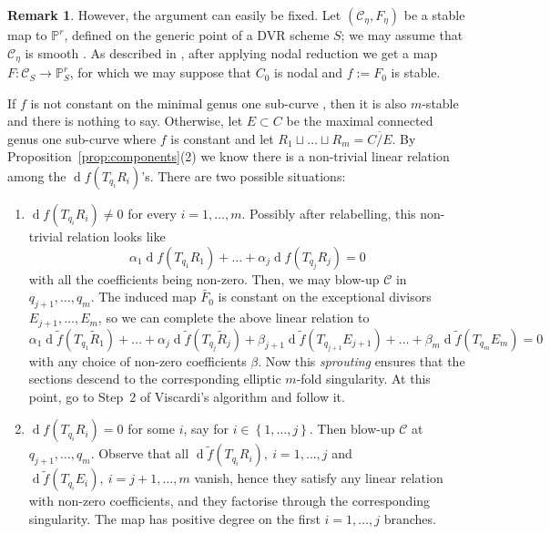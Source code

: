 \documentclass[11pt]{amsart}
\newcommand{\PP}{\mathbb P}
\renewcommand{\to}{\rightarrow}
\theoremstyle{plain}
\theoremstyle{definition}
\newtheorem{remark}[thm]{Remark}
\begin{document}
\begin{remark}
However, the argument can easily be fixed. Let $(\mathcal{C}_\eta,F_{\eta})$ be a stable map to $\PP^r$, defined on the generic point of a DVR scheme $S$; we may assume that $\mathcal C_{\eta}$ is smooth \cite[Section~3.2.1]{VISC}. 
As described in \cite[Step~1, Theorem~3.6]{VISC}, after applying nodal reduction we get a map $F\colon\mathcal C_S\to\PP^r_{S}$, for which we may suppose that $C_0$ is nodal and $f:=F_0$ is stable.

If $f$ is not constant on the minimal genus one sub-curve \cite{SMY1}, then it is also $m$-stable and there is nothing to say. Otherwise, let $E\subset C$ be the maximal connected genus one sub-curve where $f$ is constant and let $R_1\sqcup\dots\sqcup R_m=\overline{C/E}$.
 By Proposition~\ref{prop:components}(2) we know there is a non-trivial linear relation among the $\operatorname{d}\!f(T_{q_i}R_i)$'s.
 There are two possible situations:
 \begin{enumerate}
 \item $\operatorname{d}\!f(T_{q_i}R_i)\neq 0$ for every $i=1,\ldots,m$. Possibly after relabelling, this non-trivial relation looks like
 \[\alpha_1\operatorname{d}\!f(T_{q_{1}}R_{1})+\ldots +\alpha_j \operatorname{d}\!f(T_{q_{j}}R_{j})=0\]
  with all the coefficients being non-zero. Then, we may blow-up $\mathcal{C}$ in $q_{j+1},\ldots, q_m$. The induced map $\tilde{F_0}$ is constant on the exceptional divisors $E_{j+1},\ldots, E_m$, so we can complete the above linear relation to 
 \[\alpha_1\operatorname{d}\!\tilde f(T_{q_{1}}\tilde R_{1})+\ldots +\alpha_j \operatorname{d}\!\tilde f(T_{q_{j}}\tilde R_{j})+\beta_{j+1}\operatorname{d}\!\tilde f(T_{q_{j+1}}E_{j+1})+\ldots+\beta_m\operatorname{d}\!\tilde f(T_{q_{m}}E_m)=0\]
  with any choice of non-zero coefficients $\beta$. Now this \emph{sprouting} \cite[Section 2.3]{SMY2} ensures that the sections descend to the corresponding elliptic $m$-fold singularity. At this point, go to Step~2 of Viscardi's algorithm and follow it.
\item  
$\operatorname{d}\!f(T_{q_i}R_i)=0$ for some $i$, say for $i\in\left\{1,\dots,j\right\}$. 
 Then blow-up $\mathcal{C}$ at $q_{j+1},\ldots, q_m$. Observe that all $\operatorname{d}\!\tilde f(T_{q_i}R_i),\ i=1,\ldots,j$ and $\operatorname{d}\!\tilde f(T_{q_i}E_i),\ i=j+1,\ldots,m$ vanish, hence they satisfy any linear relation with non-zero coefficients, and they factorise through the corresponding singularity. The map has positive degree on the first $i=1,\ldots,j$ branches.
 \end{enumerate}
\end{remark}
\end{document}
